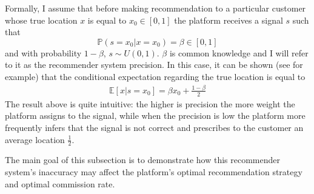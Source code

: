 \documentclass[a4paper]{article}
\begin{document}
Formally, I assume that before making recommendation to a particular customer whose true location $x$ is equal to $x_0 \in [0, 1]$ the platform receives a signal $s$ such that $$\mathbb{P}(s=x_0|x=x_0) = \beta \in [0, 1]$$ and with probability $1-\beta$, $s \sim U(0, 1)$. $\beta$ is common knowledge and I will refer to it as the recommender system precision. In this case, it can be shown (see  \cite{li2018recommender} for example) that the conditional expectation regarding the true location is equal to \begin{align}\label{signal}
\mathbb{E}[x|s=x_0] = \beta x_0 + \frac{1-\beta}{2}
\end{align}
The result above is quite intuitive: the higher is precision the more weight the platform assigns to the signal, while when the precision is low the platform more frequently infers that the signal is not correct and prescribes to the customer an average location $\frac{1}{2}$. 


The main goal of this subsection is to demonstrate how this recommender system's inaccuracy may affect the platform's optimal recommendation strategy and optimal commission rate.
\end{document}
